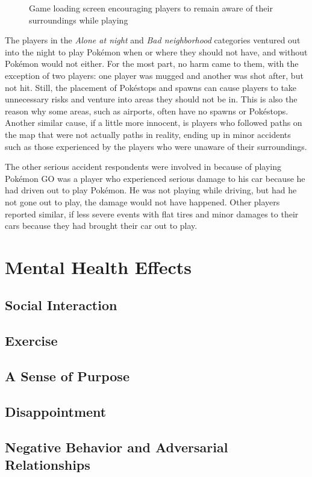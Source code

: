 \begin{figure}[h]
	\centering
	\caption{Game loading screen encouraging players to remain aware of their surroundings while playing}
	\label{fig:loading-screen-aware-of-surroundings}
\end{figure}

The players in the \emph{Alone at night} and \emph{Bad neighborhood} categories ventured out into the night to play Pokémon when or where they should not have, and without Pokémon would not either. For the most part, no harm came to them, with the exception of two players: one player was mugged  and another was shot after, but not hit. Still, the placement of Pokéstops and spawns can cause players to take unnecessary risks and venture into areas they should not be in. This is also the reason why some areas, such as airports, often have no spawns or Pokéstops. Another similar cause, if a little more innocent, is players who followed paths on the map that were not actually paths in reality, ending up in minor accidents such as those experienced by the players who were unaware of their surroundings.

The other serious accident respondents were involved in because of playing Pokémon GO was a player who experienced serious damage to his car because he had driven out to play Pokémon. He was not playing while driving, but had he not gone out to play, the damage would not have happened. Other players reported similar, if less severe events with flat tires and minor damages to their cars because they had brought their car out to play.


\chapter{Mental Health Effects}
\label{chapter:player-study-mental}


\section{Social Interaction}
\label{sub:mental-health-social}


\section{Exercise}

\section{A Sense of Purpose}

\section{Disappointment}

\section{Negative Behavior and Adversarial Relationships}